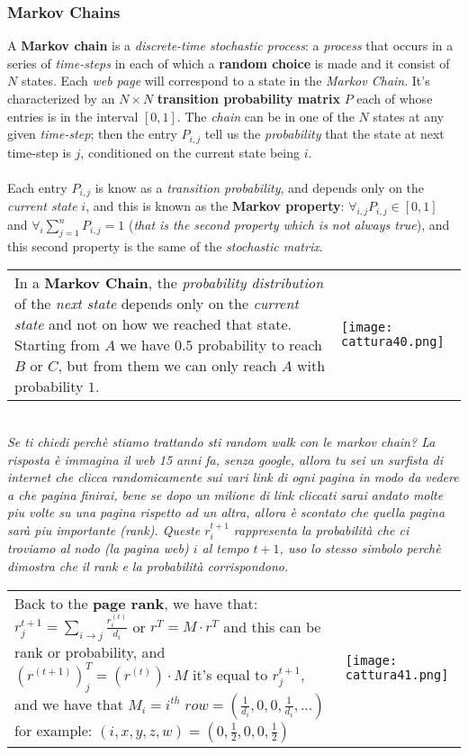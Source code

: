 \documentclass{article}
\begin{document}
\subsubsection{Markov Chains}
A \textbf{Markov chain} is a \emph{discrete-time stochastic process}: a \emph{process} that occurs in a series of \emph{time-steps} in each of which a \textbf{random choice} is made and it consist of $N$ states. Each \emph{web page} will correspond to a state in the \emph{Markov Chain}. It's characterized by an $N \times N$ \textbf{transition probability matrix} $P$ each of whose entries is in the interval $\left [0,1\right]$. The \emph{chain} can be in one of the $N$ states at any given \emph{time-step}; then the entry $P_{i,j}$ tell us the \emph{probability} that the state at next time-step is $j$, conditioned on the current state being $i$. \\\\
Each entry $P_{i,j}$ is know as a \emph{transition probability}, and depends only on the \emph{current state} $i$, and this is known as the \textbf{Markov property}: $\forall_{i,j} P_{i,j} \in \left[0,1\right]$ and $\forall_i \sum_{j=1}^{n} P_{i,j} = 1$ (\emph{that is the second property which is not always true}), and this second property is the same of the \emph{stochastic matrix}.
\begin{tabular}{L{11cm} C{5cm}}
In a \textbf{Markov Chain}, the \emph{probability distribution} of the \emph{next state} depends only on the \emph{current state} and not on how we reached that state. Starting from $A$ we have $0.5$ probability to reach $B$ or $C$, but from them we can only reach $A$ with probability $1$.
& \texttt{[image: cattura40.png]} 
\end{tabular}\\
\emph{Se ti chiedi perchè stiamo trattando sti random walk con le markov chain? La risposta è immagina il web 15 anni fa, senza google, allora tu sei un surfista di internet che clicca randomicamente sui vari link di ogni pagina in modo da vedere a che pagina finirai, bene se dopo un milione di link cliccati sarai andato molte piu volte su una pagina rispetto ad un altra, allora è scontato che quella pagina sarà piu importante (rank). Queste $r_i^{t+1}$ rappresenta la probabilità che ci troviamo al nodo (la pagina web) $i$ al tempo $t+1$, uso lo stesso simbolo perchè dimostra che il rank e la probabilità corrispondono.
}\\
\begin{tabular}{L{11cm} C{5cm}}
Back to the \textbf{page rank}, we have that: $r_j^{t+1} = \sum_{i \rightarrow j}\frac{r^{(t)}_i}{d_i}$ or $r^T = M\cdot r^T$ and this can be rank or probability, and $(r^{(t+1)})^T_j = (r^{(t)}) \cdot M$ it's equal to $r_j^{t+1}$, and we have that $M_i = i^{th}\; row =  ( \frac{1}{d_i}, 0,0,  \frac{1}{d_i}, ...)$ for example: $(i,x,y,z,w) = (0,\frac{1}{2}, 0,0 ,\frac{1}{2})$
& \texttt{[image: cattura41.png]} 
\end{tabular}\\
\end{document}

